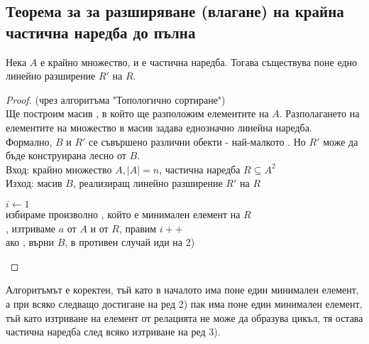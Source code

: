 \subsection*{Теорема за за разширяване (влагане) на крайна частична наредба до пълна}
\begin{theorem}
    Нека \(A\) е крайно множество,  и  е частична наредба. Тогава 
    съществува поне едно линейно разширение \(R'\) на \(R\).
\end{theorem}
\begin{proof}
    (чрез алгоритъма "Топологично сортиране") \\
    Ще построим масив , в който ще разположим елементите на \(A\). Разполагането на 
    елементите на множество в масив задава еднозначно линейна наредба. \\
    Формално, \(B\) и \(R'\) се съвършено различни обекти - най-малкото 
    . Но \(R'\) може да бъде конструирана лесно от \(B\). \\

    Вход: крайно множество \(A, |A| = n\), частична наредба \(R \subseteq A^2\) \\
    Изход: масив \(B\), реализиращ линейно разширение \(R'\) на \(R\)
    \begin{algorithmic}[1]
        \State $i \gets 1$ \\
        избираме произволно , който е минимален елемент на \(R\) \\
        , изтриваме \(a\) от \(A\) и от \(R\), правим \(i++\) \\
        ако , върни \(B\), в противен случай иди на 2)
    \end{algorithmic}
\end{proof}

Алгоритъмът е коректен, тъй като в началото има поне един минимален елемент, а при всяко следващо достигане 
на ред 2) пак има поне един минимален елемент, тъй като изтриване на елемент от релацията не може да 
образува цикъл, тя остава частична наредба след всяко изтриване на ред 3).
